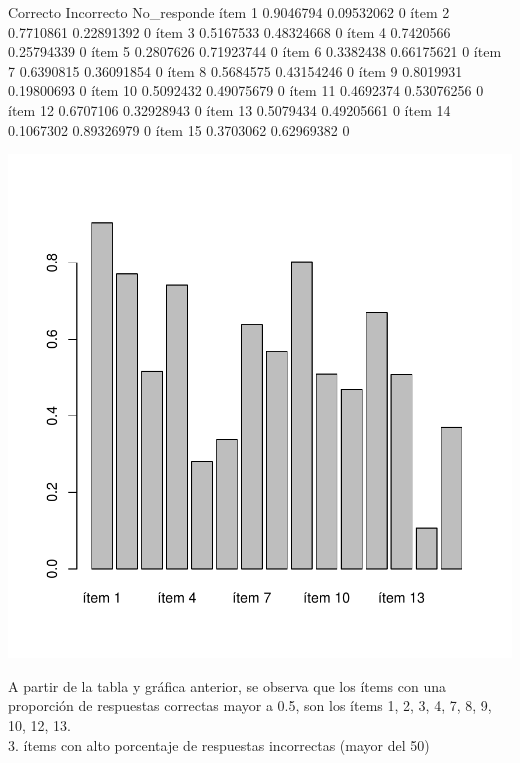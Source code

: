 \documentclass{article}
\begin{document}
\begin{Schunk}
\begin{Soutput}
         Correcto Incorrecto No_responde
ítem 1  0.9046794 0.09532062           0
ítem 2  0.7710861 0.22891392           0
ítem 3  0.5167533 0.48324668           0
ítem 4  0.7420566 0.25794339           0
ítem 5  0.2807626 0.71923744           0
ítem 6  0.3382438 0.66175621           0
ítem 7  0.6390815 0.36091854           0
ítem 8  0.5684575 0.43154246           0
ítem 9  0.8019931 0.19800693           0
ítem 10 0.5092432 0.49075679           0
ítem 11 0.4692374 0.53076256           0
ítem 12 0.6707106 0.32928943           0
ítem 13 0.5079434 0.49205661           0
ítem 14 0.1067302 0.89326979           0
ítem 15 0.3703062 0.62969382           0
\end{Soutput}
\end{Schunk}
\includegraphics{Documento_de_prueba-003}

A partir de la tabla y gráfica anterior, se observa que los ítems con una proporción de respuestas correctas mayor a 0.5, son los ítems 1, 2, 3, 4, 7, 8, 9, 10, 12, 13. \\ 

3.	ítems con alto porcentaje de respuestas incorrectas (mayor del 50) 
\end{document}
